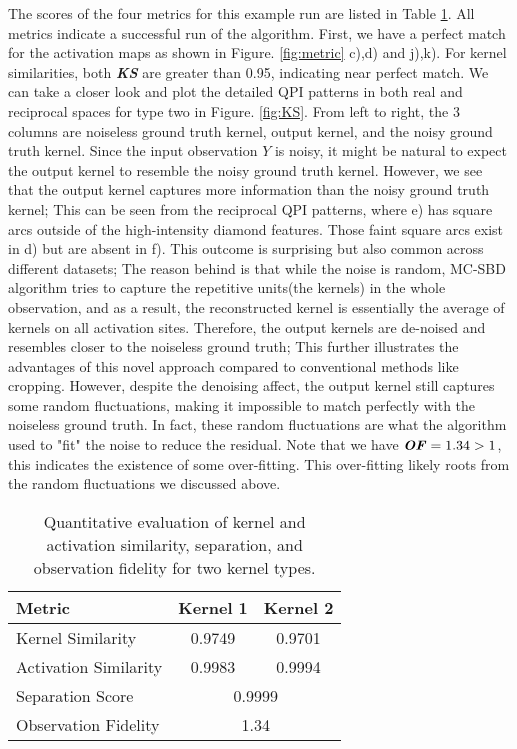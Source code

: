 The scores of the four metrics for this example run are listed in Table \ref{table:metric}. All metrics indicate a successful run of the algorithm. First, we have a perfect match for the activation maps as shown in Figure. \ref{fig:metric} c),d) and j),k). For kernel similarities, both \textbf{\textit{KS}} are greater than 0.95, indicating near perfect match. We can take a closer look and plot the detailed \ac{QPI} patterns in both real and reciprocal spaces for type two in Figure. \ref{fig:KS}. From left to right, the 3 columns are noiseless ground truth kernel, output kernel, and the noisy ground truth kernel. Since the input observation $Y$ is noisy, it might be natural to expect the output kernel to resemble the noisy ground truth kernel. However, we see that the output kernel captures more information than the noisy ground truth kernel; This can be seen from the reciprocal \ac{QPI} patterns, where e) has square arcs outside of the high-intensity diamond features. Those faint square arcs exist in d) but are absent in f). This outcome is surprising but also common across different datasets; The reason behind is that while the noise is random, \ac{MC-SBD} algorithm tries to capture the repetitive units(the kernels) in the whole observation, and as a result, the reconstructed kernel is essentially the average of kernels on all activation sites. Therefore, the output kernels are de-noised and resembles closer to the noiseless ground truth; This further illustrates the advantages of this novel approach compared to conventional methods like cropping. 
However, despite the denoising affect, the output kernel still captures some random fluctuations, making it impossible to match perfectly with the noiseless ground truth. In fact, these random fluctuations are what the algorithm used to "fit" the noise to reduce the residual. Note that we have $\textbf{\textit{OF}} = 1.34 > 1 $, this indicates the existence of some over-fitting. This over-fitting likely roots from the random fluctuations we discussed above. 
\begin{table}[h]
	\label{table:metric}
	\centering
	\begin{tabular}{|l|c|c|}
		\hline
		\textbf{Metric} & \textbf{Kernel 1} & \textbf{Kernel 2} \\
		\hline
		Kernel Similarity & 0.9749 & 0.9701 \\
		\hline
		Activation Similarity & 0.9983 & 0.9994 \\
		\hline
		Separation Score & \multicolumn{2}{c|}{0.9999} \\
		\hline
		Observation Fidelity & \multicolumn{2}{c|}{1.34} \\
		\hline
	\end{tabular}
	\caption{Quantitative evaluation of kernel and activation similarity, separation, and observation fidelity for two kernel types.}
\end{table}


